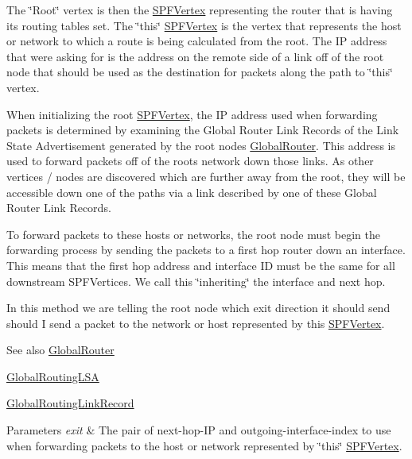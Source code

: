 The \char`\"{}\+Root\char`\"{} vertex is then the \hyperlink{classns3_1_1SPFVertex}{S\+P\+F\+Vertex} representing the router that is having its routing tables set. The \char`\"{}this\char`\"{} \hyperlink{classns3_1_1SPFVertex}{S\+P\+F\+Vertex} is the vertex that represents the host or network to which a route is being calculated from the root. The IP address that we\textquotesingle{}re asking for is the address on the remote side of a link off of the root node that should be used as the destination for packets along the path to \char`\"{}this\char`\"{} vertex.

When initializing the root \hyperlink{classns3_1_1SPFVertex}{S\+P\+F\+Vertex}, the IP address used when forwarding packets is determined by examining the Global Router Link Records of the Link State Advertisement generated by the root node\textquotesingle{}s \hyperlink{classns3_1_1GlobalRouter}{Global\+Router}. This address is used to forward packets off of the root\textquotesingle{}s network down those links. As other vertices / nodes are discovered which are further away from the root, they will be accessible down one of the paths via a link described by one of these Global Router Link Records.

To forward packets to these hosts or networks, the root node must begin the forwarding process by sending the packets to a first hop router down an interface. This means that the first hop address and interface ID must be the same for all downstream S\+P\+F\+Vertices. We call this \char`\"{}inheriting\char`\"{} the interface and next hop.

In this method we are telling the root node which exit direction it should send should I send a packet to the network or host represented by \textquotesingle{}this\textquotesingle{} \hyperlink{classns3_1_1SPFVertex}{S\+P\+F\+Vertex}.

\begin{DoxySeeAlso}{See also}
\hyperlink{classns3_1_1GlobalRouter}{Global\+Router} 

\hyperlink{classns3_1_1GlobalRoutingLSA}{Global\+Routing\+L\+SA} 

\hyperlink{classns3_1_1GlobalRoutingLinkRecord}{Global\+Routing\+Link\+Record} 
\end{DoxySeeAlso}

\begin{DoxyParams}{Parameters}
{\em exit} & The pair of next-\/hop-\/\+IP and outgoing-\/interface-\/index to use when forwarding packets to the host or network represented by \char`\"{}this\char`\"{} \hyperlink{classns3_1_1SPFVertex}{S\+P\+F\+Vertex}. \\
\hline
\end{DoxyParams}

